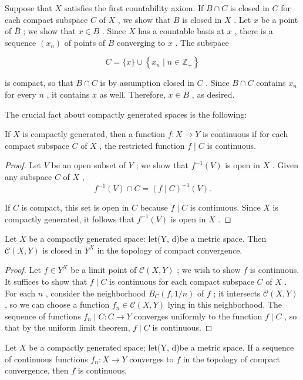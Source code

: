 Suppose that \(X\) satisfies the first countability axiom. If \(B \cap  C\) is closed in \(C\) for each compact subspace \(C\) of \(X\) , we show that \(B\) is closed in \(X\) . Let \(x\) be a point of \(\bar{B}\) ; we show that \(x \in  B\) . Since \(X\) has a countable basis at \(x\) , there is a sequence \(\left( {x}_{n}\right)\) of points of \(B\) converging to \(x\) . The subspace

\[
C = \{ x\}  \cup  \left\{  {{x}_{n} \mid  n \in  {\mathbb{Z}}_{ + }}\right\}
\]

is compact, so that \(B \cap  C\) is by assumption closed in \(C\) . Since \(B \cap  C\) contains \({x}_{n}\) for every \(n\) , it contains \(x\) as well. Therefore, \(x \in  B\) , as desired.

The crucial fact about compactly generated spaces is the following:

\begin{lemma} If \(X\) is compactly generated, then a function \(f : X \rightarrow  Y\) is continuous if for each compact subspace \(C\) of \(X\) , the restricted function \(f \mid  C\) is continuous.
\end{lemma}

\begin{proof}Let \(V\) be an open subset of \(Y\) ; we show that \({f}^{-1}\left( V\right)\) is open in \(X\) . Given any subspace \(C\) of \(X\) ,
\[
{f}^{-1}\left( V\right)  \cap  C = {\left( f \mid  C\right) }^{-1}\left( V\right) .
\]

If \(C\) is compact, this set is open in \(C\) because \(f \mid  C\) is continuous. Since \(X\) is compactly generated, it follows that \({f}^{-1}\left( V\right)\) is open in \(X\) .
\end{proof}
\begin{theorem} Let \(X\) be a compactly generated space: let(Y, d)be a metric space. Then \(\mathcal{C}\left( {X,Y}\right)\) is closed in \({Y}^{X}\) in the topology of compact convergence.
\end{theorem}

\begin{proof}Let \(f \in  {Y}^{X}\) be a limit point of \(\mathcal{C}\left( {X,Y}\right)\) ; we wish to show \(f\) is continuous. It suffices to show that \(f \mid  C\) is continuous for each compact subspace \(C\) of \(X\) . For each \(n\) , consider the neighborhood \({B}_{C}\left( {f,1/n}\right)\) of \(f\) ; it intersects \(\mathcal{C}\left( {X,Y}\right)\) , so we can choose a function \({f}_{n} \in  \mathcal{C}\left( {X,Y}\right)\) lying in this neighborhood. The sequence of functions \({f}_{n} \mid  C : C \rightarrow  Y\) converges uniformly to the function \(f \mid  C\) , so that by the uniform limit theorem, \(f \mid  C\) is continuous.\end{proof}
\begin{corollary} Let \(X\) be a compactly generated space; let(Y, d)be a metric space. If a sequence of continuous functions \({f}_{n} : X \rightarrow  Y\) converges to \(f\) in the topology of compact convergence, then \(f\) is continuous.
\end{corollary}

